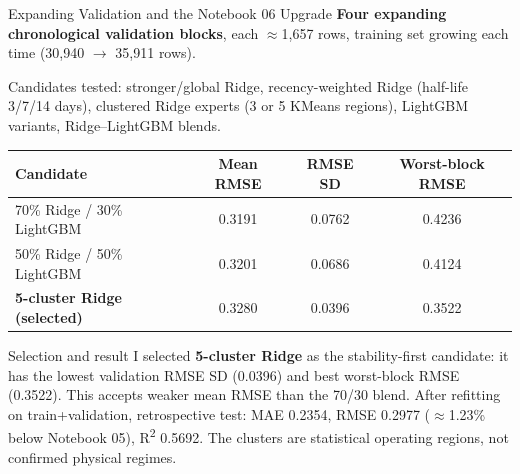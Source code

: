 \documentclass[11pt,aspectratio=169]{beamer}
\begin{document}
\begin{frame}{Expanding Validation and the Notebook 06 Upgrade}
\textbf{Four expanding chronological validation blocks}, each $\approx$1,657 rows, training set growing each time (30{,}940 $\to$ 35{,}911 rows).
\vspace{0.15cm}

Candidates tested: stronger/global Ridge, recency-weighted Ridge (half-life 3/7/14 days), clustered Ridge experts (3 or 5 KMeans regions), LightGBM variants, Ridge–LightGBM blends.

\vspace{0.1cm}
\begin{center}
\scriptsize
\begin{tabular}{lccc}
\toprule
\textbf{Candidate} & \textbf{Mean RMSE} & \textbf{RMSE SD} & \textbf{Worst-block RMSE} \\
\midrule
70\% Ridge / 30\% LightGBM & 0.3191 & 0.0762 & 0.4236 \\
50\% Ridge / 50\% LightGBM & 0.3201 & 0.0686 & 0.4124 \\
\textbf{5-cluster Ridge (selected)} & 0.3280 & 0.0396 & 0.3522 \\
\bottomrule
\end{tabular}
\end{center}

\begin{block}{Selection and result}
\small I selected \textbf{5-cluster Ridge} as the stability-first candidate: it has the lowest validation RMSE SD (0.0396) and best worst-block RMSE (0.3522). This accepts weaker mean RMSE than the 70/30 blend. After refitting on train+validation, retrospective test: MAE 0.2354, RMSE 0.2977 ($\approx$1.23\% below Notebook 05), R\textsuperscript{2} 0.5692. The clusters are statistical operating regions, not confirmed physical regimes.
\end{block}
\end{frame}
\end{document}

